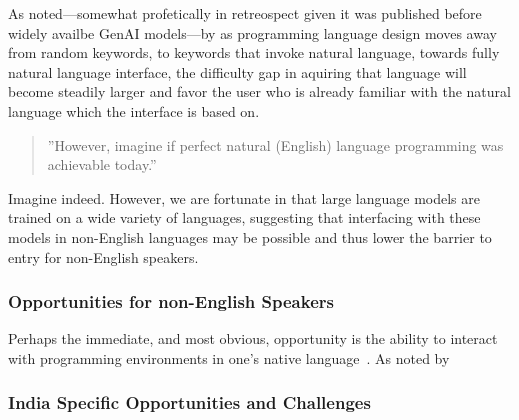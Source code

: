 As noted---somewhat profetically in retreospect given it was published before
widely availbe GenAI models---by \citet{becker2019parlez} as programming
language design moves away from random keywords, to keywords that invoke
natural language, towards fully natural language interface, the difficulty gap
in aquiring that language will become steadily larger and favor the user who is
already familiar with the natural language which the interface is based on. 
\begin{quote}
   ''However, imagine if perfect natural (English) language programming was
   achievable today.''
\end{quote}
Imagine indeed. However, we are fortunate in that large language models are
trained on a wide variety of languages, suggesting that interfacing with these
models in non-English languages may be possible and thus lower the barrier to 
entry for non-English speakers.


\subsubsection{Opportunities for non-English Speakers}

Perhaps the immediate, and most obvious, opportunity is the ability to interact
with programming environments in one's native language~\cite{smith2024explain,
li2024bridging, raihan2024mhumaneval, prather2025breaking}.
As noted by 



\subsubsection{India Specific Opportunities and Challenges}

